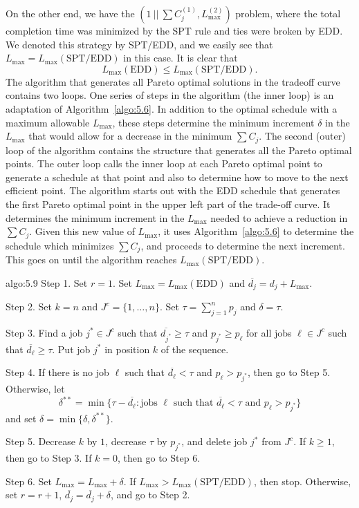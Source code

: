 On the other end, we have the $(1~||~\sum C_j^{(1)}, L_{\max}^{(2)})$ problem, 
where the total completion time was minimized by the SPT rule and ties were 
broken by EDD. We denoted this strategy by SPT/EDD, and we easily see that 
$L_{\max} = L_{\max}(\text{SPT/EDD})$ in this case. It is clear that 
\[ L_{\max}(\text{EDD}) \leq L_{\max}(\text{SPT/EDD}). \] 
The algorithm that generates all Pareto optimal solutions in the tradeoff 
curve contains two loops. One series of steps in the algorithm (the inner 
loop) is an adaptation of Algorithm~\ref{algo:5.6}. In addition to the optimal 
schedule with a maximum allowable $L_{\max}$, these steps determine 
the minimum increment $\delta$ in the $L_{\max}$ that would allow for a 
decrease in the minimum $\sum C_j$. The second (outer) loop of the algorithm 
contains the structure that generates all the Pareto optimal points.
The outer loop calls the inner loop at each Pareto optimal point to generate a 
schedule at that point and also to determine how to move to the next efficient 
point. The algorithm starts out with the EDD schedule that generates the first
Pareto optimal point in the upper left part of the trade-off curve. It 
determines the minimum increment in the $L_{\max}$ needed to achieve a 
reduction in $\sum C_j$. Given this new value of $L_{\max}$, it uses 
Algorithm~\ref{algo:5.6} to determine the schedule which minimizes 
$\sum C_j$, and proceeds to determine the next increment. This goes on 
until the algorithm reaches $L_{\max}(\text{SPT/EDD})$. 

\begin{algo}{algo:5.9}
    {\sc Step 1.} Set $r = 1$. Set $L_{\max} = L_{\max}(\text{EDD})$ and 
    $\overline{d_j} = d_j + L_{\max}$. 

    {\sc Step 2.} Set $k = n$ and $J^c = \{1, \dots, n\}$. Set 
    $\tau = \sum_{j=1}^n p_j$ and $\delta = \tau$. 

    {\sc Step 3.} Find a job $j^* \in J^c$ such that $\overline{d_{j^*}} \geq \tau$ 
    and $p_{j^*} \geq p_\ell$ for all jobs $\ell \in J^c$ such that 
    $\overline{d_\ell} \geq \tau$. Put job $j^*$ in position $k$ of the 
    sequence. 

    {\sc Step 4.} If there is no job $\ell$ such that $\overline{d_\ell} < 
    \tau$ and $p_\ell > p_{j^*}$, then go to Step 5. Otherwise, let 
    \[ \delta^{**} = \min\{\tau - \overline{d_\ell} : 
    \text{jobs $\ell$ such that $\overline{d_\ell} < \tau$ and 
    $p_\ell > p_{j^*}$}\} \] 
    and set $\delta = \min\{\delta, \delta^{**}\}$. 

    {\sc Step 5.} Decrease $k$ by $1$, decrease $\tau$ by $p_{j^*}$, 
    and delete job $j^*$ from $J^c$. If $k \geq 1$, then go to Step 3. 
    If $k = 0$, then go to Step 6. 

    {\sc Step 6.} Set $L_{\max} = L_{\max} + \delta$. If $L_{\max} 
    > L_{\max}(\text{SPT/EDD})$, then stop. Otherwise, set 
    $r = r+1$, $\overline{d_j} = \overline{d_j} + \delta$, and 
    go to Step 2. 
\end{algo}

